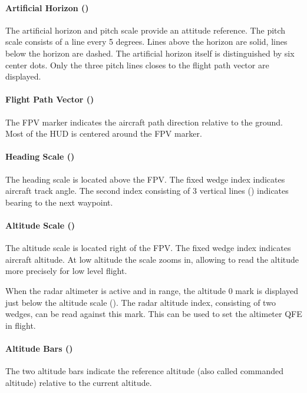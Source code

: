 \paragraph{Artificial Horizon ()}
The artificial horizon and pitch scale provide an attitude reference.
The pitch scale consists of a line every 5 degrees.
Lines above the horizon are solid, lines below the horizon are dashed.
The artificial horizon itself is distinguished by six center dots.
Only the three pitch lines closes to the flight path vector are displayed.

\paragraph{Flight Path Vector ()}
The FPV marker indicates the aircraft path direction relative to the ground.
Most of the HUD is centered around the FPV marker.

\paragraph{Heading Scale ()}
The heading scale is located above the FPV.
The fixed wedge index indicates aircraft track angle.
The second index consisting of 3 vertical lines
() indicates bearing to the next waypoint.

\paragraph{Altitude Scale ()}
The altitude scale is located right of the FPV.
The fixed wedge index indicates aircraft altitude.
At low altitude the scale zooms in,
allowing to read the altitude more precisely for low level flight.

When the radar altimeter is active and in range,
the altitude 0 mark is displayed just below the altitude scale
().
The radar altitude index, consisting of two wedges, can be read against this mark.
This can be used to set the altimeter QFE in flight.

\paragraph{Altitude Bars ()}
The two altitude bars indicate the reference altitude
(also called commanded altitude) relative to the current altitude.

